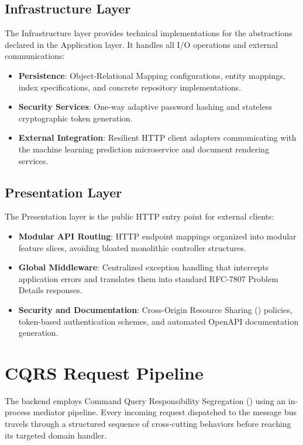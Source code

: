 \subsection{Infrastructure Layer}
The Infrastructure layer provides technical implementations for the abstractions declared in the Application layer. It handles all I/O operations and external communications:
\begin{itemize}
  \item \textbf{Persistence}: Object-Relational Mapping configurations, entity mappings, index specifications, and concrete repository implementations.
  \item \textbf{Security Services}: One-way adaptive password hashing and stateless cryptographic token generation.
  \item \textbf{External Integration}: Resilient HTTP client adapters communicating with the machine learning prediction microservice and document rendering services.
\end{itemize}

\subsection{Presentation Layer}
The Presentation layer is the public HTTP entry point for external clients:
\begin{itemize}
  \item \textbf{Modular API Routing}: HTTP endpoint mappings organized into modular feature slices, avoiding bloated monolithic controller structures.
  \item \textbf{Global Middleware}: Centralized exception handling that intercepts application errors and translates them into standard RFC-7807 Problem Details responses.
  \item \textbf{Security and Documentation}: Cross-Origin Resource Sharing () policies, token-based authentication schemes, and automated OpenAPI documentation generation.
\end{itemize}

\section{CQRS Request Pipeline}
\label{sec:cqrs_pipeline}

The backend employs Command Query Responsibility Segregation () using an in-process mediator pipeline. Every incoming request dispatched to the message bus travels through a structured sequence of cross-cutting behaviors before reaching its targeted domain handler.

